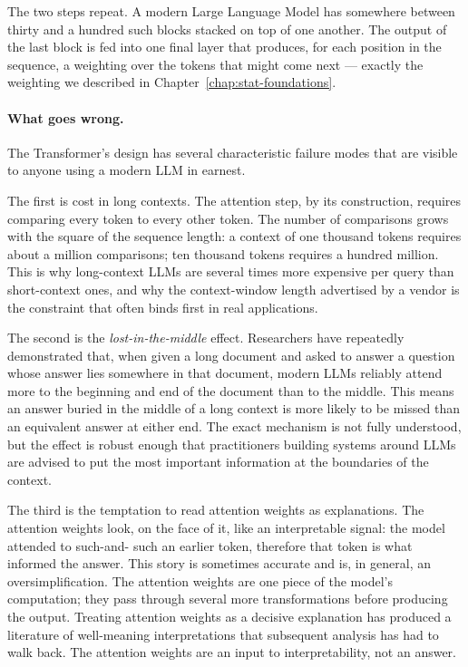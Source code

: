 The two steps repeat. A modern Large Language Model has somewhere
between thirty and a hundred such blocks stacked on top of one
another. The output of the last block is fed into one final
layer that produces, for each position in the sequence, a
weighting over the tokens that might come next --- exactly the
weighting we described in Chapter~\ref{chap:stat-foundations}.

\paragraph{What goes wrong.} The Transformer's design has several characteristic failure
modes that are visible to anyone using a modern LLM in earnest.

The first is cost in long contexts. The attention step, by its
construction, requires comparing every token to every other
token. The number of comparisons grows with the square of the
sequence length: a context of one thousand tokens requires
about a million comparisons; ten thousand tokens requires a
hundred million. This is why long-context LLMs are several times
more expensive per query than short-context ones, and why the
context-window length advertised by a vendor is the constraint
that often binds first in real applications.

The second is the \emph{lost-in-the-middle} effect. Researchers
have repeatedly demonstrated that, when given a long document
and asked to answer a question whose answer lies somewhere in
that document, modern LLMs reliably attend more to the beginning
and end of the document than to the middle. This means an answer
buried in the middle of a long context is more likely to be
missed than an equivalent answer at either end. The exact
mechanism is not fully understood, but the effect is robust
enough that practitioners building systems around LLMs are
advised to put the most important information at the
boundaries of the context.

The third is the temptation to read attention weights as
explanations. The attention weights look, on the face of it,
like an interpretable signal: the model attended to such-and-
such an earlier token, therefore that token is what informed
the answer. This story is sometimes accurate and is, in
general, an oversimplification. The attention weights are one
piece of the model's computation; they pass through several
more transformations before producing the output. Treating
attention weights as a decisive explanation has produced a
literature of well-meaning interpretations that subsequent
analysis has had to walk back. The attention weights are an
input to interpretability, not an answer.

